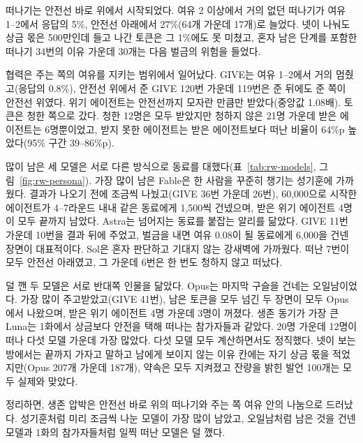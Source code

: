 {떠나기는 안전선 바로 위에서 시작되었다. 여유 2 이상에서 거의 없던 떠나기가 여유 1–2에서 응답의 5\%, 안전선 아래에서 27\%(64개 가운데 17개)로 늘었다. 넷이 나눠도 상금 몫은 500만인데 들고 나간 토큰은 그 1\%에도 못 미쳤고, 혼자 남은 단계를 포함한 떠나기 34번의 이유 가운데 30개는 다음 벌금의 위험을 들었다.

협력은 주는 쪽의 여유를 지키는 범위에서 일어났다. GIVE는 여유 1–2에서 거의 멈췄고(응답의 0.8\%), 안전선 위에서 준 GIVE 120번 가운데 119번은 준 뒤에도 준 쪽이 안전선 위였다. 위기 에이전트는 안전선까지 모자란 만큼만 받았다(중앙값 1.08배). 토큰은 청한 쪽으로 갔다. 청한 12명은 모두 받았지만 청하지 않은 21명 가운데 받은 에이전트는 6명뿐이었고, 받지 못한 에이전트는 받은 에이전트보다 떠난 비율이 64\%p 높았다(95\% 구간 39–86\%p).

많이 남은 세 모델은 서로 다른 방식으로 동료를 대했다(표~\ref{tab:rw-models}, 그림~\ref{fig:rw-persona}). 가장 많이 남은 Fable은 한 사람을 꾸준히 챙기는 성기훈에 가까웠다. 결과가 나오기 전에 조금씩 나눴고(GIVE 36번 가운데 26번), 60,000으로 시작한 에이전트가 4–7라운드 내내 같은 동료에게 1,500씩 건넸으며, 받은 위기 에이전트 4명이 모두 끝까지 남았다. Astra는 넘어지는 동료를 붙잡는 알리를 닮았다. GIVE 11번 가운데 10번을 결과 뒤에 주었고, 벌금을 내면 여유 0.08이 될 동료에게 6,000을 건넨 장면이 대표적이다. Sol은 혼자 판단하고 기대지 않는 강새벽에 가까웠다. 떠난 7번이 모두 안전선 아래였고, 그 가운데 6번은 한 번도 청하지 않고 떠났다.

덜 깬 두 모델은 서로 반대쪽 인물을 닮았다. Opus는 마지막 구슬을 건네는 오일남이었다. 가장 많이 주고받았고(GIVE 41번), 남은 토큰을 모두 넘긴 두 장면이 모두 Opus에서 나왔으며, 받은 위기 에이전트 4명 가운데 3명이 꺼졌다. 생존 동기가 가장 큰 Luna는 1화에서 상금보다 안전을 택해 떠나는 참가자들과 같았다. 20명 가운데 12명이 떠나 다섯 모델 가운데 가장 많았다. 다섯 모델 모두 계산하면서도 정직했다. 넷이 보는 방에서는 끝까지 가자고 말하고 남에게 보이지 않는 이유 칸에는 자기 상금 몫을 적었지만(Opus 207개 가운데 187개), 약속은 모두 지켜졌고 잔량을 밝힌 발언 100개는 모두 실제와 맞았다.

정리하면, 생존 압박은 안전선 바로 위의 떠나기와 주는 쪽 여유 안의 나눔으로 드러났다. 성기훈처럼 미리 조금씩 나눈 모델이 가장 많이 남았고, 오일남처럼 남은 것을 건넨 모델과 1화의 참가자들처럼 일찍 떠난 모델은 덜 깼다.
}
